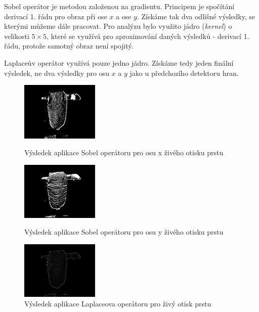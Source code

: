 Sobel operátor je metodou založenou na gradientu. Principem je spočítání derivací 1. řádu pro obraz při ose $x$ a ose $y$. Získáme tak dva odlišné výsledky, se kterými můžeme dále pracovat. Pro analýzu bylo využito jádro (\textit{kernel}) o velikosti $5\times5$, které se využívá pro aproximování daných výsledků - derivací 1. řádu, protože samotný obraz není spojitý. 

Laplaceův operátor využívá pouze jedno jádro. Získáme tedy jeden finální výsledek, ne dva výsledky pro osu $x$ a $y$ jako u předchozího detektoru hran. \cite{SobelLaplacianDetectors}

\begin{figure}[!htbp]
  \begin{minipage}[b]{0.3\linewidth}
    \centering
    \includegraphics[width=140px]{obrazky-figures/sobelxlive.png}
    \caption{Výsledek aplikace Sobel operátoru pro osu x živého otisku prstu}
  \end{minipage}
  \hspace{0.3cm}
  \begin{minipage}[b]{0.3\linewidth}
    \centering
    \includegraphics[width=140px]{obrazky-figures/sobelylive.png}
    \caption{Výsledek aplikace Sobel operátoru pro osu y živého otisku prstu}
  \end{minipage}
  \hspace{0.3cm}
    \begin{minipage}[b]{0.3\linewidth}
    \centering
    \includegraphics[width=140px]{obrazky-figures/laplacianlive.png}
    \caption{Výsledek aplikace Laplaceova operátoru pro živý otisk prstu}
  \end{minipage}
\end{figure}

